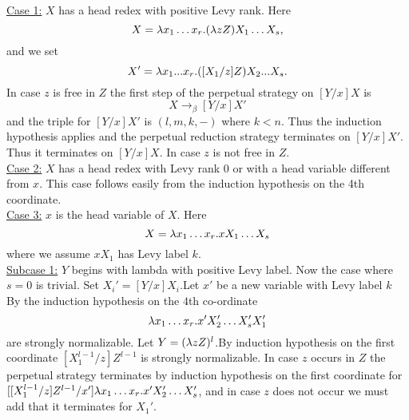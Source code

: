 \uline{Case 1:} $X$ has a head redex with positive Levy rank. Here
\begin{equation*}
  X = \lambda x_{1} \ldots x_{r}. (\lambda zZ)X_{1} \ldots X_{s},
\end{equation*}
and we set
\begin{equation*}
  X' = \lambda x_{1} ... x_{r}. ([X_{1}/z]Z)X_{2} ... X_{s}.
\end{equation*}
In case $z$ is free in $Z$ the first step of the perpetual strategy on $[Y/x]X$ is
\begin{equation*} 
  [Y/x]X \rightarrow_\beta [Y/x]X'
\end{equation*}
and the triple for $[Y/x]X'$ is $(l,m,k,-)$ where $k < n$. Thus the induction hypothesis applies and the perpetual reduction strategy terminates on $[Y/x]X'$. Thus it terminates on $[Y/x]X$. In case $z$ is not free in $Z$.\\

\uline{Case 2:} $X$ has a head redex with Levy rank $0$ or with a head variable different from $x$. This case follows easily from the induction hypothesis on the 4th coordinate.\\

\uline{Case 3:} $x$ is the head variable of $X$. Here
\begin{equation*}
  X = \lambda x_{1} \ldots x_{r}. x X_{1} \ldots X_{s}
\end{equation*}
where we assume  $x X_{1}$ has Levy label $k$.\\

\uline{Subcase 1:} $Y$ begins with lambda with positive Levy label. Now the case where $s = 0$ is trivial. Set $X_{i}' = [Y/x]X_{i}$.Let $x'$ be a new variable with Levy label $k$ By the induction hypothesis on the $4$th co-ordinate 
\begin{equation*}
  \lambda x_{1} \ldots x_{r}. x' X_{2}' \ldots X_{s}' X_{1}'
\end{equation*} 
are strongly normalizable. Let $Y = (\lambda z Z)^{l}$.By induction hypothesis on the first coordinate $[X_{1}^{l-1}/z]Z ^{l-1}$ is strongly normalizable. In case $z$ occurs in $Z$ the perpetual strategy terminates by induction hypothesis on the first coordinate for $[[X_{1}^{l-1}/z]Z ^{l-1}/x'] \lambda x_{1} \ldots x_{r}. x' X_{2}' \ldots X_{s}'$, and in case $z$ does not occur we must add that it terminates for $X_{1}'$.\\
 
